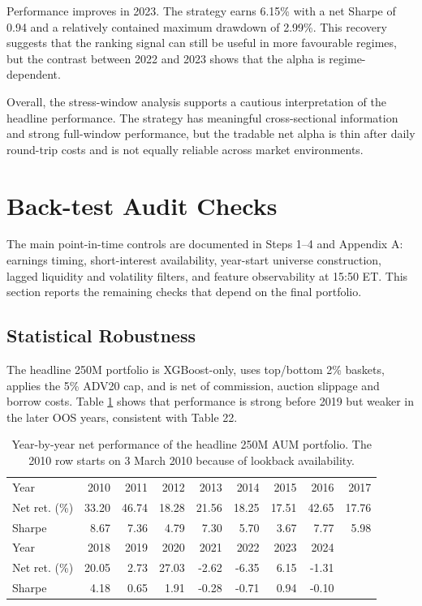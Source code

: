 \documentclass[12pt]{article}
\begin{document}
Performance improves in 2023. The strategy earns 6.15\% with a net Sharpe of 0.94 and a relatively contained maximum drawdown of 2.99\%. This recovery suggests that the ranking signal can still be useful in more favourable regimes, but the contrast between 2022 and 2023 shows that the alpha is regime-dependent.

Overall, the stress-window analysis supports a cautious interpretation of the headline performance. The strategy has meaningful cross-sectional information and strong full-window performance, but the tradable net alpha is thin after daily round-trip costs and is not equally reliable across market environments.

\section{Back-test Audit Checks}

The main point-in-time controls are documented in Steps 1--4 and Appendix A: earnings timing, short-interest availability, year-start universe construction, lagged liquidity and volatility filters, and feature observability at 15:50 ET. This section reports the remaining checks that depend on the final portfolio.

\subsection{Statistical Robustness}

The headline 250M portfolio is XGBoost-only, uses top/bottom 2\% baskets, applies the 5\% ADV20 cap, and is net of commission, auction slippage and borrow costs. Table \ref{tab:audit_yearly_compact} shows that performance is strong before 2019 but weaker in the later OOS years, consistent with Table 22.

\begin{table}[!htbp]
\centering
\scriptsize
\setlength{\tabcolsep}{3pt}
\begin{tabular}{lrrrrrrrr}
\hline
Year & 2010 & 2011 & 2012 & 2013 & 2014 & 2015 & 2016 & 2017 \\
Net ret. (\%) & 33.20 & 46.74 & 18.28 & 21.56 & 18.25 & 17.51 & 42.65 & 17.76 \\
Sharpe & 8.67 & 7.36 & 4.79 & 7.30 & 5.70 & 3.67 & 7.77 & 5.98 \\
\hline
Year & 2018 & 2019 & 2020 & 2021 & 2022 & 2023 & 2024 &  \\
Net ret. (\%) & 20.05 & 2.73 & 27.03 & -2.62 & -6.35 & 6.15 & -1.31 &  \\
Sharpe & 4.18 & 0.65 & 1.91 & -0.28 & -0.71 & 0.94 & -0.10 &  \\
\hline
\end{tabular}
\caption{Year-by-year net performance of the headline 250M AUM portfolio. The 2010 row starts on 3 March 2010 because of lookback availability.}
\label{tab:audit_yearly_compact}
\end{table}
\end{document}
